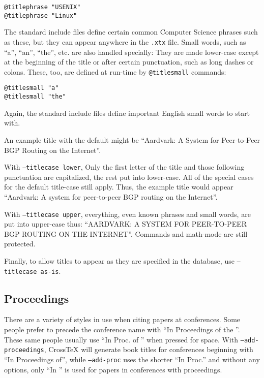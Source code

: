 \documentclass{article}
\newcommand{\XTX}{Cross\TeX}
\begin{document}
\begin{small}\begin{verbatim}
@titlephrase "USENIX"
@titlephrase "Linux"
\end{verbatim}\end{small}

The standard include files define certain common Computer Science phrases
such as these, but they can appear anywhere in the \texttt{.xtx} file.
Small words, such as ``a'', ``an'', ``the'', etc. are also handled
specially: They are made lower-case except at the beginning of the title
or after certain punctuation, such as long dashes or colons.  These,
too, are defined at run-time by \texttt{@titlesmall} commands:

\begin{small}\begin{verbatim}
@titlesmall "a"
@titlesmall "the"
\end{verbatim}\end{small}

Again, the standard include files define important English small words
to start with.

An example title with the default might be ``Aardvark: A System for
Peer-to-Peer BGP Routing on the Internet''.

With \texttt{--titlecase lower}, Only the first letter of the title and
those following punctuation are capitalized, the rest put into lower-case.
All of the special cases for the default title-case still apply.  Thus,
the example title would appear ``Aardvark: A system for peer-to-peer
BGP routing on the Internet''.

With \texttt{--titlecase upper}, everything, even known phrases and
small words, are put into upper-case thus: ``AARDVARK: A SYSTEM FOR
PEER-TO-PEER BGP ROUTING ON THE INTERNET''.  Commands and math-mode are
still protected.

Finally, to allow titles to appear as they are specified in the database,
use \texttt{--titlecase as-is}.

\subsection{Proceedings}

There are a variety of styles in use when citing papers at
conferences. Some people prefer to precede the conference name with
``In Proceedings of the ''.  These same people usually use ``In Proc. of
'' when pressed for space.  With \texttt{--add-proceedings}, \XTX{} will
generate book titles for conferences beginning with ``In Proceedings of'',
while \texttt{--add-proc} uses the shorter ``In Proc.'' and without any
options, only ``In '' is used for papers in conferences with proceedings.
\end{document}
